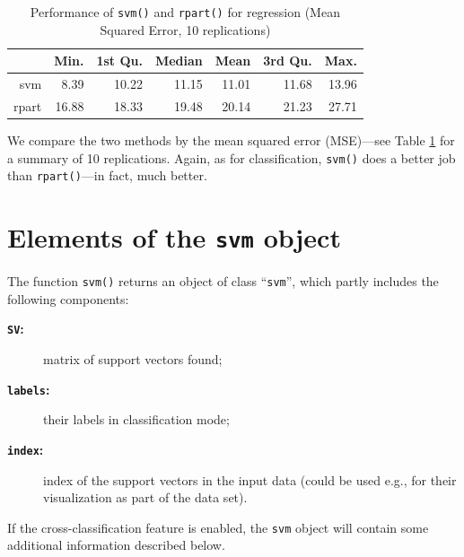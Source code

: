 \documentclass[a4paper]{article}
\begin{document}
\begin{table}[ht]
\begin{center}
\begin{tabular}{rrrrrrr}
\hline
 & Min. & 1st Qu. & Median & Mean & 3rd Qu. & Max. \\
\hline
svm & 8.39 & 10.22 & 11.15 & 11.01 & 11.68 & 13.96 \\
rpart & 16.88 & 18.33 & 19.48 & 20.14 & 21.23 & 27.71 \\
\hline
\end{tabular}
\caption{Performance of \texttt{svm()} and
       \texttt{rpart()} for regression (Mean Squared Error, 10 replications)}
\label{tab:reg}
\end{center}
\end{table}
\noindent We compare the two methods by the mean squared error (MSE)---see Table
\ref{tab:reg} for a summary of 10 replications. 
Again, as for classification, \texttt{svm()}
does a better job than \texttt{rpart()}---in fact, much better.

\section*{Elements of the \texttt{svm} object}

The function \texttt{svm()} returns an object of class ``\texttt{svm}'',
which partly includes the following components:

\begin{description}
 \item[\textbf{\texttt{SV}:}] matrix of support vectors found;
 \item[\textbf{\texttt{labels}:}] their labels in classification mode;
 \item[\textbf{\texttt{index}:}] index of the support vectors in the input data (could
  be used e.g., for their visualization as part of the data set).
\end{description}
If the cross-classification feature is enabled, the
\texttt{svm} object will contain some additional information described below.
\end{document}

